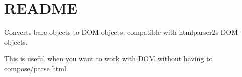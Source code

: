 \chapter{README}
\hypertarget{md_pkiclassroomrescheduler_2src_2main_2frontend_2node__modules_2dom-converter_2_r_e_a_d_m_e}{}\label{md_pkiclassroomrescheduler_2src_2main_2frontend_2node__modules_2dom-converter_2_r_e_a_d_m_e}
Converts bare objects to DOM objects, compatible with htmlparser2\textquotesingle{}s DOM objects.

This is useful when you want to work with DOM without having to compose/parse html. 